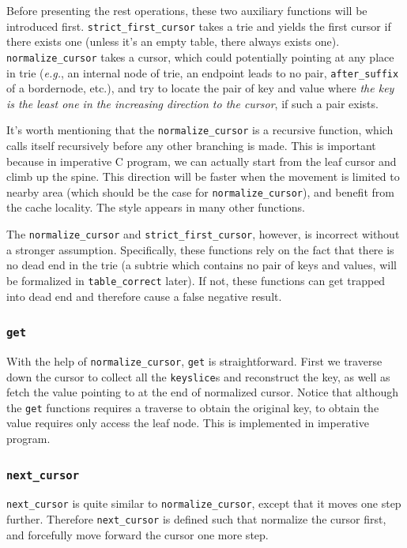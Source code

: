 \documentclass[runningheads]{llncs}
\begin{document}
Before presenting the rest operations, these two auxiliary functions will be
introduced first. \texttt{strict\_first\_cursor} takes a trie and yields the
first cursor if there exists one (unless it's an empty table, there always
exists one). \texttt{normalize\_cursor} takes a cursor, which could potentially
pointing at any place in trie (\textit{e.g.}, an internal node of trie, an
endpoint leads to no pair, \texttt{after\_suffix} of a bordernode, etc.), and
try to locate the pair of key and value where \emph{the key is the least one in
  the increasing direction to the cursor}, if such a pair exists.

It's worth mentioning that the \texttt{normalize\_cursor} is a recursive
function, which calls itself recursively before any other branching is made.
This is important because in imperative C program, we can actually start from
the leaf cursor and climb up the spine. This direction will be faster when
the movement is limited to nearby area (which should be the case for
\texttt{normalize\_cursor}), and benefit from the cache locality. The style
appears in many other functions.

The \texttt{normalize\_cursor} and \texttt{strict\_first\_cursor}, however, is
incorrect without a stronger assumption. Specifically, these functions rely on
the fact that there is no dead end in the trie (a subtrie which contains no pair
of keys and values, will be formalized in \texttt{table\_correct} later). If
not, these functions can get trapped into dead end and therefore cause a false
negative result.

\subsubsection{\texttt{get}}

With the help of \texttt{normalize\_cursor}, \texttt{get} is straightforward.
First we traverse down the cursor to collect all the \texttt{keyslice}s and
reconstruct the key, as well as fetch the value pointing to at the end of
normalized cursor. Notice that although the \texttt{get} functions requires a
traverse to obtain the original key, to obtain the value requires only access
the leaf node. This is implemented in imperative program.

\subsubsection{\texttt{next\_cursor}}

\texttt{next\_cursor} is quite similar to \texttt{normalize\_cursor}, except
that it moves one step further. Therefore \texttt{next\_cursor} is defined such
that normalize the cursor first, and forcefully move forward the cursor one more
step.
\end{document}
